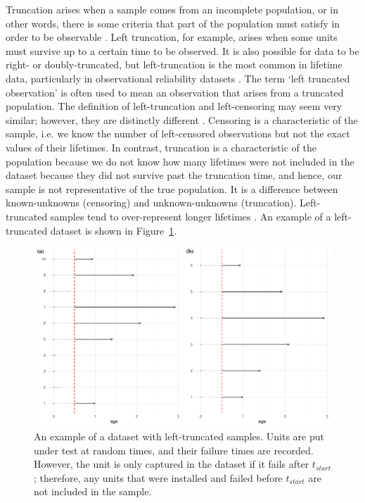 Truncation arises when a sample comes from an incomplete population, or in other words, there is some criteria that part of the population must satisfy in order to be observable \citep{guo1993}. Left truncation, for example, arises when some units must survive up to a certain time to be observed. It is also possible for data to be right- or doubly-truncated, but left-truncation is the most common in lifetime data, particularly in observational reliability datasets \citep{}. The term `left truncated observation' is often used to mean an observation that arises from a truncated population. The definition of left-truncation and left-censoring may seem very similar; however, they are distinctly different \citep{mitra2013}. Censoring is a characteristic of the sample, i.e. we know the number of left-censored observations but not the exact values of their lifetimes. In contrast, truncation is a characteristic of the population because we do not know how many lifetimes were not included in the dataset because they did not survive past the truncation time, and hence, our sample is not representative of the true population. It is a difference between known-unknowns (censoring) and unknown-unknowns (truncation). Left-truncated samples tend to over-represent longer lifetimes \citep{guo1993}. An example of a left-truncated dataset is shown in Figure~\ref{fig:left_trunc_example}.

\begin{figure}[h]
    \centering
    \includegraphics[width=1\textwidth]{./figures/left_truncation_example.pdf}
    \caption{An example of a dataset with left-truncated samples. Units are put under test at random times, and their failure times are recorded. However, the unit is only captured in the dataset if it fails after $t_{start}$; therefore, any units that were installed and failed before $t_{start}$ are not included in the sample.}
    \label{fig:left_trunc_example}
\end{figure}

